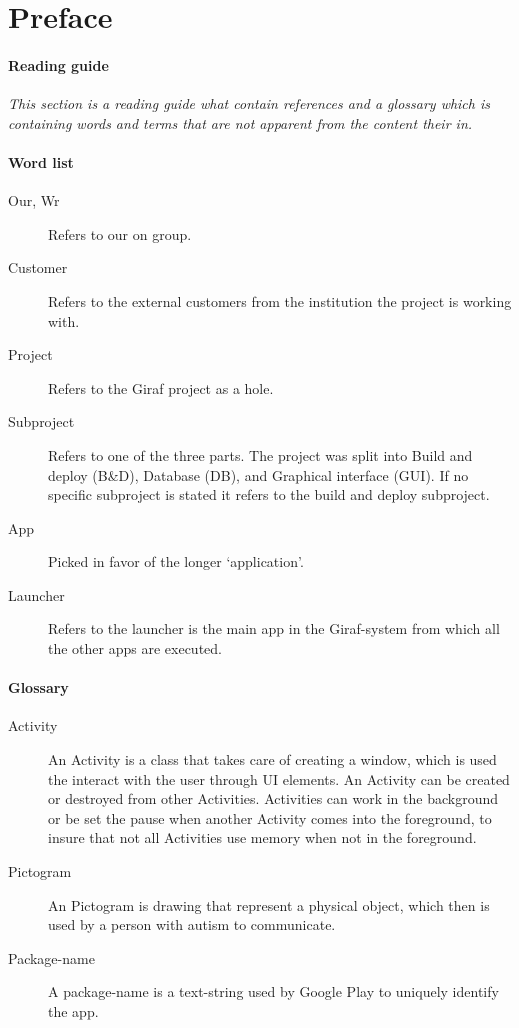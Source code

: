 \chapter*{Preface}

\subsubsection{Reading guide}
\textit{This section is a reading guide what contain references and a glossary which is containing words and terms that are not apparent from the content their in.}

\subsubsection{Word list}

\begin{description}
  \item[Our, Wr] Refers to our on group.
  
  \item[Customer] Refers to the external customers from the institution the project is working with.
  
  \item[Project] Refers to the Giraf project as a hole.
  
  \item[Subproject] Refers to one of the three parts. The project was split into Build and deploy (B&D), Database (DB), and Graphical interface (GUI). If no specific subproject is stated it refers to the build and deploy subproject.
  
  \item[App] Picked in favor of the longer ‘application’.
  
  \item[Launcher] Refers to the launcher is the main app in the Giraf-system from which all the other apps are executed.
\end{description}

\subsubsection{Glossary}

\begin{description}
  \item[Activity] An Activity is a class that takes care of creating a window, which is used the interact with the user through UI elements. An Activity can be created or destroyed from other Activities. Activities can work in the background or be set the pause when another Activity comes into the foreground, to insure that not all Activities use memory when not in the foreground. 
  
  \item[Pictogram] An Pictogram is drawing that represent a physical object, which then is used by a person with autism to communicate. 
  
  \item[Package-name] A package-name is a text-string used by Google Play to uniquely identify the app.
  
\end{description}